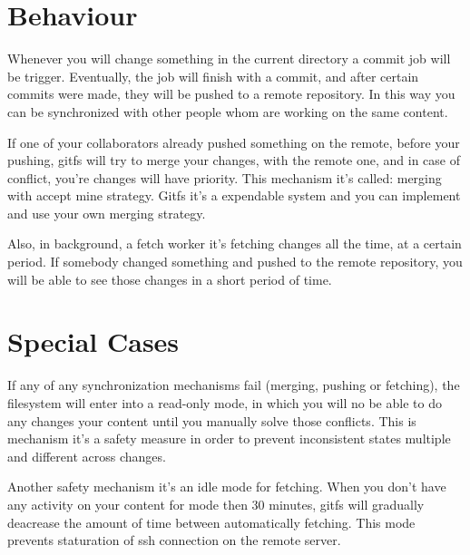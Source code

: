 \section{Behaviour}

Whenever you will change something in the current directory a commit job will be trigger. Eventually, the job will finish with a commit, and after certain commits were made, they will be pushed to a remote repository. In this way you can be synchronized  with other people whom are working on the same content.

If one of your collaborators already pushed something on the remote, before your pushing, gitfs will try to merge your changes, with the remote one, and in case of conflict, you're changes will have priority. This mechanism it's called: merging with accept mine strategy. Gitfs it's a expendable system and you can implement and use your own merging strategy.

Also, in background, a fetch worker it's fetching changes all the time, at a certain period. If somebody changed something and pushed to the remote repository, you will be able to see those changes in a short period of time.

\section{Special Cases}
If any of any synchronization mechanisms fail (merging, pushing or fetching), the filesystem will enter into a read-only mode, in which you will no be able to do any changes your content until you manually solve those conflicts. This is mechanism it's a safety measure in order to prevent inconsistent states multiple and different across changes.

Another safety mechanism it's an idle mode for fetching. When you don't have any activity on your content for mode then 30 minutes, gitfs will gradually deacrease the amount of time between automatically fetching. This mode prevents staturation of ssh connection on the remote server. 